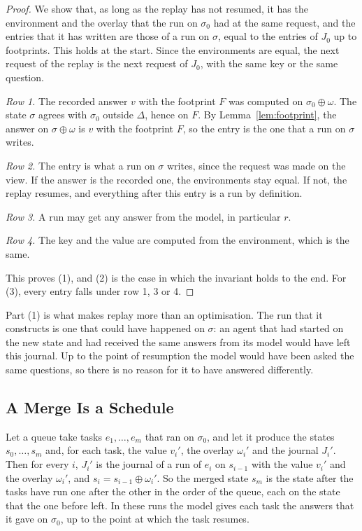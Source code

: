 \documentclass[acmsmall,nonacm,screen]{acmart}
\newcommand{\upd}{\oplus}
\begin{document}
\begin{proof}
We show that, as long as the replay has not resumed, it has the environment and the overlay
that the run on $\sigma_0$ had at the same request, and the entries that it has written are
those of a run on $\sigma$, equal to the entries of $J_0$ up to footprints. This holds at
the start. Since the environments are equal, the next request of the replay is the next
request of $J_0$, with the same key or the same question.

\emph{Row 1.} The recorded answer $v$ with the footprint $F$ was computed on
$\sigma_0 \upd \omega$. The state $\sigma$ agrees with $\sigma_0$ outside $\Delta$, hence on
$F$. By Lemma~\ref{lem:footprint}, the answer on $\sigma \upd \omega$ is $v$ with the
footprint $F$, so the entry is the one that a run on $\sigma$ writes.

\emph{Row 2.} The entry is what a run on $\sigma$ writes, since the request was made on the
view. If the answer is the recorded one, the environments stay equal. If not, the replay
resumes, and everything after this entry is a run by definition.

\emph{Row 3.} A run may get any answer from the model, in particular $r$.

\emph{Row 4.} The key and the value are computed from the environment, which is the same.

This proves (1), and (2) is the case in which the invariant holds to the end. For (3), every
entry falls under row 1, 3 or 4.
\end{proof}

Part (1) is what makes replay more than an optimisation. The run that it constructs is one
that could have happened on $\sigma$: an agent that had started on the new state and had
received the same answers from its model would have left this journal. Up to the point of
resumption the model would have been asked the same questions, so there is no reason for it
to have answered differently.

\subsection{A Merge Is a Schedule}

\begin{theorem}
\label{thm:schedule}
Let a queue take tasks $e_1, \ldots, e_m$ that ran on $\sigma_0$, and let it produce the
states $s_0, \ldots, s_m$ and, for each task, the value $v_i'$, the overlay $\omega_i'$ and
the journal $J_i'$. Then for every $i$, $J_i'$ is the journal of a run of $e_i$ on $s_{i-1}$
with the value $v_i'$ and the overlay $\omega_i'$, and $s_i = s_{i-1} \upd \omega_i'$. So
the merged state $s_m$ is the state after the tasks have run one after the other in the
order of the queue, each on the state that the one before left. In these runs the model
gives each task the answers that it gave on $\sigma_0$, up to the point at which the task
resumes.
\end{theorem}
\end{document}
